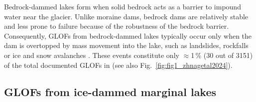 
Bedrock-dammed lakes form when solid bedrock acts as a barrier to impound water near the glacier. Unlike moraine dams, bedrock dams are relatively stable and less prone to failure because of the robustness of the bedrock barrier. Consequently, GLOFs from bedrock-dammed lakes typically occur only when the dam is overtopped by mass movement into the lake, such as landslides, rockfalls or ice and snow avalanches \citep{Huggel&al2004, Haeberli&al2017,Emmer2017}. These events constitute only $\approx$1\,\% (30 out of 3151) of the total documented GLOFs in \cite{Lutzow&al2023} (see also Fig.~\ref{fig:fig1_zhnagetal2024}).


\subsection{GLOFs from ice-dammed marginal lakes}
\label{subsection:glofs_ice-dammed_lakes}

